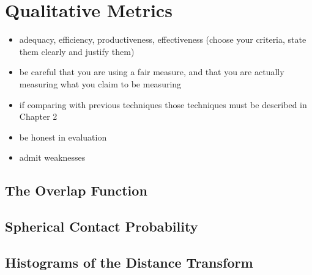 
\chapter{Qualitative Metrics}

\mynote
{
\begin{itemize}
\item adequacy, efficiency, productiveness, effectiveness (choose your criteria, state them clearly and justify them)
\item be careful that you are using a fair measure, and that you are actually measuring what you claim to be measuring
\item if comparing with previous techniques those techniques must be described in Chapter 2
\item be honest in evaluation
\item admit weaknesses
\end{itemize}
}


\section{The Overlap Function}



\section{Spherical Contact Probability}



\section{Histograms of the Distance Transform}



